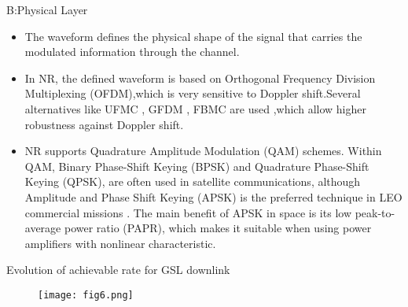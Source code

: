 \documentclass{beamer}
\begin{document}
\begin{frame}
\begin{block}{B:Physical Layer}
\begin{itemize}
    \item The waveform defines the physical shape of the signal that carries the modulated information  through the channel.
    \item In NR, the defined waveform is based on Orthogonal Frequency Division Multiplexing (OFDM),which is very sensitive to Doppler shift.Several alternatives like UFMC , GFDM , FBMC are used ,which allow higher robustness against Doppler shift.
    \item NR supports Quadrature Amplitude Modulation (QAM) schemes. Within QAM, Binary Phase-Shift Keying (BPSK) and Quadrature Phase-Shift Keying (QPSK), are often used in satellite communications, although Amplitude and Phase Shift Keying (APSK) is the preferred technique in LEO commercial missions . The main benefit of APSK in space is its low peak-to-average power ratio (PAPR), which makes it suitable when using power amplifiers with nonlinear characteristic.
\end{itemize}
\end{block}
\end{frame}

\begin{frame}{Evolution of achievable rate for GSL downlink}
\begin{figure}
    \centering
    \texttt{[image: fig6.png]}
\end{figure}
\end{frame}
\end{document}
